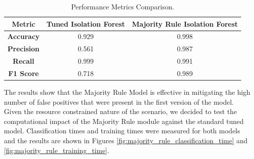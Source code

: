 \documentclass[futureinternet,article,submit,pdftex,moreauthors]{Definitions/mdpi}
\begin{document}
\begin{table}[H]
    \caption{Performance Metrics Comparison.}\label{tab:majority_rule_performanceMetrics}
    \begin{tabularx}{\textwidth}{CCC}
    \toprule
    \textbf{Metric} & \textbf{Tuned Isolation Forest} & \textbf{Majority Rule Isolation Forest} \\
    \midrule
    \textbf{Accuracy}  & 0.929 & 0.998 \\
    \textbf{Precision} & 0.561 & 0.987 \\
    \textbf{Recall}    & 0.999 & 0.991 \\
    \textbf{F1 Score}  & 0.718 & 0.989 \\
    \bottomrule
    \end{tabularx}
\end{table}

The results show that the Majority Rule Model is effective in mitigating the high number of false positives that were present in the first version of the model. 
Given the resource constrained nature of the scenario, we decided to test the computational impact of the Majority Rule module against the standard tuned model. 
Classification times and training times were measured for both models and the results are shown in Figures \ref{fig:majority_rule_classification_time} and \ref{fig:majority_rule_training_time}.
\end{document}
